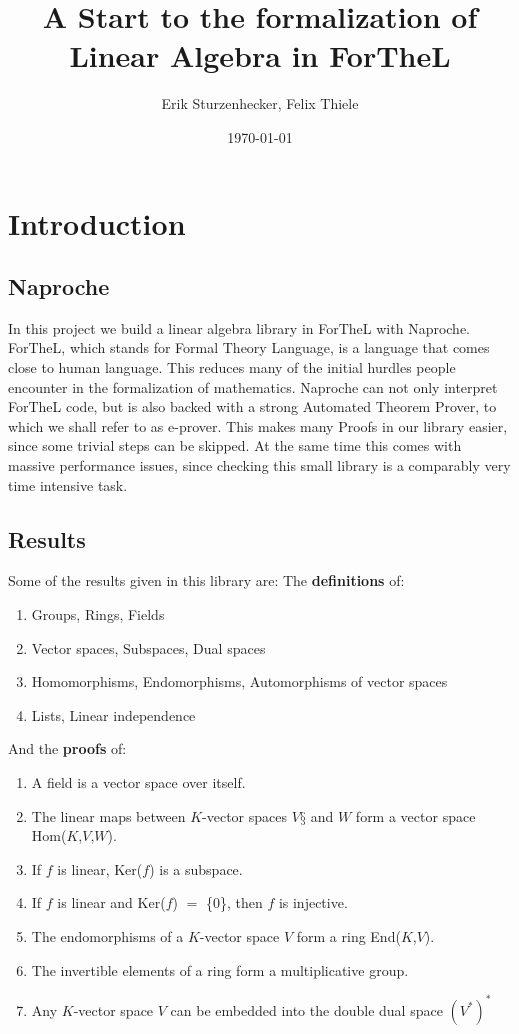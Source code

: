 \documentclass[11pt]{article}
\author{Erik Sturzenhecker, Felix Thiele}
\title{A Start to the formalization of Linear Algebra in ForTheL}
\date{\today}
\begin{document}
\maketitle

\newpage 
\setcounter{tocdepth}{10}
\tableofcontents


\newpage 
\section{Introduction}
\subsection{Naproche}
In this project we build a linear algebra library in ForTheL with Naproche. ForTheL, which stands for Formal Theory Language, is a language that comes close to human language. This reduces many of the initial hurdles people encounter in the formalization of mathematics. Naproche can not only interpret ForTheL code, but is also backed with a strong Automated Theorem Prover, to which we shall refer to as e-prover. This makes many Proofs in our library easier, since some trivial steps can be skipped. At the same time this comes with massive performance issues, since checking this small library is a comparably very time intensive task.

\subsection{Results}
Some of the results given in this library are:
\newline
The \textbf{definitions} of:
\begin{enumerate}[noitemsep]
\item Groups, Rings, Fields
\item Vector spaces, Subspaces, Dual spaces
\item Homomorphisms, Endomorphisms, Automorphisms of vector spaces
\item Lists, Linear independence
\end{enumerate}
And the \textbf{proofs} of:
\begin{enumerate}[noitemsep]
\item A field is a vector space over itself.
\item The linear maps between $K$-vector spaces $V§$ and $W$ form a vector space Hom($K$,$V$,$W$).
\item If $f$ is linear, Ker($f$) is a subspace.
\item If $f$ is linear and Ker($f$) $=$ \{0\}, then $f$ is injective.
\item The endomorphisms of a $K$-vector space $V$ form a ring End($K$,$V$).
\item The invertible elements of a ring form a multiplicative group.
\item Any $K$-vector space $V$ can be embedded into the double dual space $(V^{*})^{*}$
\end{enumerate}
\end{document}
